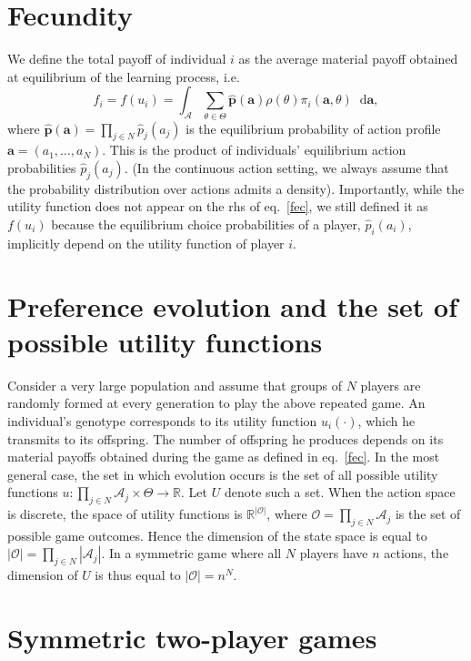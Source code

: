 \documentclass[11pt,reqno]{amsart}
\newcommand{\st}{\rho} %
\newcommand{\e}{\theta} %
\newcommand{\Et}{\Theta} %
\newcommand{\na}{n} %
\newcommand{\ac}{a} %
\newcommand{\Ac}{\mathcal{A}} %
\newcommand{\p}{p} %
\newcommand{\vp}{\mathbf{p}} %
\newcommand{\de}{\mathop{}\!\mathrm{d}} %
\newcommand{\va}{\mathbf{a}} %
\newcommand{\pay}{\pi} %
\newcommand{\Rn}{\mathds{R}} %
\newcommand{\np}{N}%
\newcommand{\Om}{\mathcal{O}} %
\newcommand{\fc}{f} %
\newcommand{\pf}{u} %
\newcommand{\Pf}{U} %
\begin{document}
\section{Fecundity}

We define the total payoff of individual $i$ as the average material payoff obtained at equilibrium of the learning process, i.e.
\begin{equation}
\label{fec}
\fc_{i} = \fc(\pf_i) = \int_{\Ac} \sum_{\e\in\Et} \hat{\vp}(\va) \st(\e) \pay_i(\va,\e) \de \va,
\end{equation}
where $\hat{\vp}(\va) = \prod_{j\in N} \hat{\p}_j(\ac_j)$ is the equilibrium probability of action profile $\va = (\ac_1,\dots,\ac_\np)$. This is the product of individuals' equilibrium action probabilities $\hat{\p}_j(\ac_j)$. (In the continuous action setting, we always assume that the probability distribution over actions admits a density). Importantly, while the utility function does not appear on the rhs of eq.~\ref{fec}, we still defined it as $\fc(\pf_i)$ because the equilibrium choice probabilities of a player, $\hat{\p}_i(\ac_i)$, implicitly depend on the utility function of player $i$.

\section{Preference evolution and the set of possible utility functions}

Consider a very large population and assume that groups of $\np$ players are randomly formed at every generation to play the above repeated game. An individual's genotype corresponds to its utility function $\pf_i(\cdot)$, which he transmits to its offspring. The number of offspring he produces depends on its material payoffs obtained during the game as defined in eq.~\ref{fec}. In the most general case, the set in which evolution occurs is the set of all possible utility functions $\pf : \prod_{j\in \np} \Ac_j \times \Et  \to \Rn$. Let $\Pf$ denote such a set. When the action space is discrete, the space of utility functions is $\Rn^{|\Om|}$, where $\Om = \prod_{j\in \np} \Ac_j$ is the set of possible game outcomes. Hence the dimension of the state space is equal to $|\Om| = \prod_{j\in \np} |\Ac_j|$. In a symmetric game where all $\np$ players have $\na$ actions, the dimension of $\Pf$ is thus equal to $|\Om| = \na^\np$.


\section{Symmetric two-player games}
\end{document}
